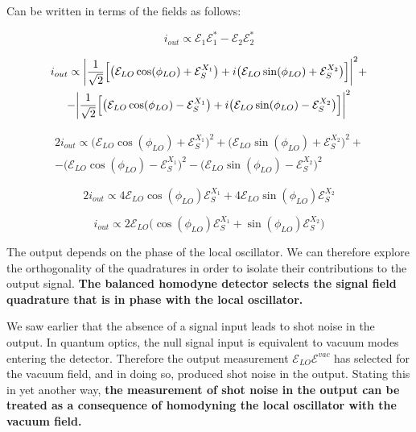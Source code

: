 \documentclass[12pt,a4paper]{report}
\begin{document}
Can be written in terms of the fields as follows:

\begin{equation}
    i_{out}\propto \mathcal{E}_1\mathcal{E}_1^*-\mathcal{E}_2\mathcal{E}_2^*
\end{equation}

\begin{multline}
    i_{out}\propto \abs{\frac{1}{\sqrt{2}}\Big[   \big(\mathcal{E}_{LO}\cos(\phi_{LO})+\mathcal{E}_S^{X_1}\big)  +i\big(\mathcal{E}_{LO}\sin(\phi_{LO})+\mathcal{E}_S^{X_2}\big)\Big]}^2+\\-\abs{\frac{1}{\sqrt{2}}\Big[   \big(\mathcal{E}_{LO}\cos(\phi_{LO})-\mathcal{E}_S^{X_1}\big)  +i\big(\mathcal{E}_{LO}\sin(\phi_{LO})-\mathcal{E}_S^{X_2}\big)\Big]}^2
\end{multline}

\begin{multline}
    2i_{out}\propto \big(\mathcal{E}_{LO}\cos(\phi_{LO})+\mathcal{E}_S^{X_1}\big)^2  +\big(\mathcal{E}_{LO}\sin(\phi_{LO})+\mathcal{E}_S^{X_2}\big)^2+\\-   \big(\mathcal{E}_{LO}\cos(\phi_{LO})-\mathcal{E}_S^{X_1}\big)^2  -\big(\mathcal{E}_{LO}\sin(\phi_{LO})-\mathcal{E}_S^{X_2}\big)^2
\end{multline}

\begin{equation}
    2i_{out}\propto4\mathcal{E}_{LO}\cos(\phi_{LO})\mathcal{E}_S^{X_1}+4\mathcal{E}_{LO}\sin(\phi_{LO})\mathcal{E}_S^{X_2}
\end{equation}

\begin{equation}
    i_{out}\propto2\mathcal{E}_{LO}\Big(\cos(\phi_{LO})\mathcal{E}_S^{X_1}+\sin(\phi_{LO})\mathcal{E}_S^{X_2}\Big)
\end{equation}

The output depends on the phase of the local oscillator. We can therefore explore the orthogonality of the quadratures in order to isolate their contributions to the output signal. \textbf{The balanced homodyne detector selects the signal field quadrature that is in phase with the local oscillator.}

We saw earlier that the absence of a signal input leads to shot noise in the output. In quantum optics, the null signal input is equivalent to vacuum modes entering the detector. Therefore the output measurement $\mathcal{E}_{LO}\mathcal{E}^{vac}$ has selected for the vacuum field, and in doing so, produced shot noise in the output. Stating this in yet another way, \textbf{the measurement of shot noise in the output can be treated as a consequence of homodyning the local oscillator with the vacuum field.}
\end{document}
